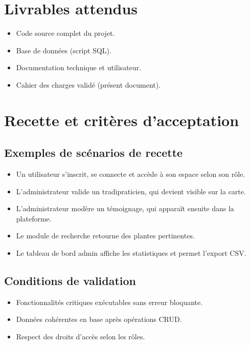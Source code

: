 \documentclass[12pt,a4paper]{article}
\begin{document}
\section{Livrables attendus}
\begin{itemize}[leftmargin=1.2cm]
  \item Code source complet du projet.
  \item Base de données (script SQL).
  \item Documentation technique et utilisateur.
  \item Cahier des charges validé (présent document).
\end{itemize}

\section{Recette et critères d'acceptation}
\subsection{Exemples de scénarios de recette}
\begin{itemize}[leftmargin=1.2cm]
  \item Un utilisateur s'inscrit, se connecte et accède à son espace selon son rôle.
  \item L'administrateur valide un tradipraticien, qui devient visible sur la carte.
  \item L'administrateur modère un témoignage, qui apparaît ensuite dans la plateforme.
  \item Le module de recherche retourne des plantes pertinentes.
  \item Le tableau de bord admin affiche les statistiques et permet l'export CSV.
\end{itemize}

\subsection{Conditions de validation}
\begin{itemize}[leftmargin=1.2cm]
  \item Fonctionnalités critiques exécutables sans erreur bloquante.
  \item Données cohérentes en base après opérations CRUD.
  \item Respect des droits d'accès selon les rôles.
\end{itemize}
\end{document}
